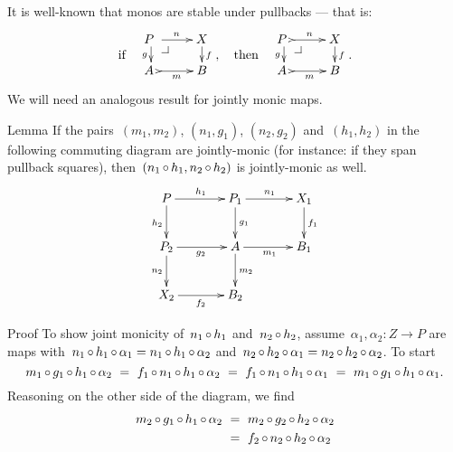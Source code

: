 \documentclass[b]{subfiles}
\begin{document}
\begin{parsec}%
\begin{point}%
It is well-known that monos are stable under pullbacks ---
that is:
\begin{equation*}
    \text{if} \quad
    \vcenter{\vbox{\xymatrix@R-1pc{
                {P\ } \pullback \ar[r]^n \ar[d]_g
        & X \ar[d]^f
                \\ {A\ } \ar@{>->}[r]_{m}
    & B}}} ,
    \quad \text{then} \quad
    \vcenter{\vbox{\xymatrix@R-1pc{
                {P\ } \pullback \ar@{>->}[r]^n \ar[d]_g
        & X \ar[d]^f
                \\ {A\ } \ar@{>->}[r]_{m}
    & B}}}.
\end{equation*}
We will need an analogous result for jointly monic maps.
\end{point}
\begin{point}{Lemma}%
If the pairs~$(m_1,m_2)$, $(n_1,g_1)$, $(n_2,g_2)$ and~$(h_1,h_2)$
in the following commuting diagram
are jointly-monic (for instance: if they span pullback squares),
then~$(n_1 \mathop{\circ} h_1, n_2 \mathop{\circ} h_2)$ is jointly-monic as well.
\begin{equation*}
    \xymatrix@C+1pc{
        P \ar[r]^{h_1} \ar[d]_{h_2}
        &P_1\ar[r]^{n_1} \ar[d]^{g_1}
        &X_1 \ar[d]^{f_1}
        \\ P_2\ar[r]_{g_2} \ar[d]_{n_2}
        & A \ar[r]_{m_1} \ar[d]^{m_2}
        & B_1 
        \\ X_2 \ar[r]_{f_2}
        & B_2
    }
\end{equation*}
\begin{point}{Proof}%
To show joint monicity of~$n_1 \mathop{\circ} h_1$ and~$n_2 \mathop{\circ} h_2$,
assume~$\alpha_1,\alpha_2  \colon Z \to P$
    are maps with~$
        n_1 \mathop{\circ} h_1 \mathop{\circ} \alpha_1
        = n_1 \mathop{\circ} h_1 \mathop{\circ} \alpha_2$
    and~$n_2 \mathop{\circ} h_2 \mathop{\circ} \alpha_1
        = n_2 \mathop{\circ} h_2 \mathop{\circ} \alpha_2$.
To start
\begin{equation*}
    m_1 \mathop{\circ} g_1 \mathop{\circ} h_1 \mathop{\circ} \alpha_2
    \ =\  f_1 \mathop{\circ} n_1 \mathop{\circ} h_1 \mathop{\circ} \alpha_2 
    \ =\  f_1 \mathop{\circ} n_1 \mathop{\circ} h_1 \mathop{\circ} \alpha_1 
            \ =\  m_1 \mathop{\circ} g_1 \mathop{\circ} h_1 \mathop{\circ} \alpha_1.
\end{equation*}
Reasoning on the other side of the diagram, we find
\begin{align*}
    m_2 \after g_1 \after h_1 \after \alpha_2
    &\ =\  m_2 \after g_2 \after h_2 \after \alpha_2 \\ 
    &\ =\  f_2 \after n_2 \after h_2 \after \alpha_2 \\ 

\end{align*}
\end{point}
\end{point}
\end{parsec}
\end{document}
